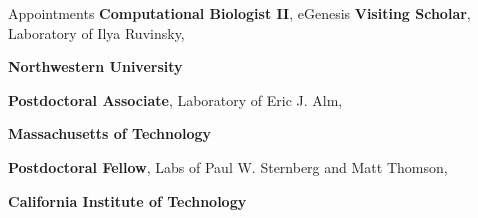 \begin{rubric}{Appointments}
\entry*[11/2019 -]
	\textbf{Computational Biologist II}, eGenesis
\entry*[7/2020 -]
	\textbf{Visiting Scholar}, Laboratory of Ilya Ruvinsky,
	\par \textbf{Northwestern University}

\entry*[01/2019--11/2019]
		\textbf{Postdoctoral Associate}, Laboratory of Eric J. Alm,
		\par \textbf{Massachusetts of Technology}

\entry*[11/2018--01/2019]
		\textbf{Postdoctoral Fellow}, Labs of Paul W. Sternberg and Matt Thomson,
		\par \textbf{California Institute of Technology}

\end{rubric}
